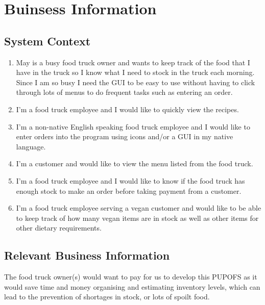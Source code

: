 
\section{Buinsess Information}
\label{sect:buisness}

\subsection{System Context}
\begin{enumerate}
	\item May is a busy food truck owner and wants to keep track of the food that I have in the truck so I know what I need to stock in the truck each morning. Since I am so busy I need the GUI to be easy to use without having to click through lots of menus to do frequent tasks such as entering an order.
	\item I’m a food truck employee and I would like to quickly view the recipes.
	\item I’m a non-native English speaking food truck employee and I would like to enter orders into the program using icons and/or a GUI in my native language.
	\item I’m a customer and would like to view the menu listed from the food truck.
	\item I’m a food truck employee and I would like to know if the food truck has enough stock to make an order before taking payment from a customer.
	\item I’m a food truck employee serving a vegan customer and would like to be able to keep track of how many vegan items are in stock as well as other items for other dietary requirements.
\end{enumerate}

\subsection{Relevant Business Information}
The food truck owner(s) would want to pay for us to develop this PUPOFS as it would save time and money organising and estimating inventory levels, which can lead to the prevention of shortages in stock, or lots of spoilt food.
